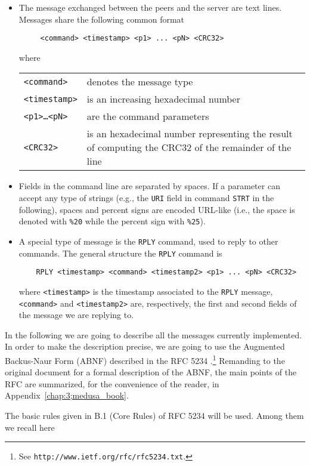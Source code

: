 \documentclass{medusabook}
\begin{document}
\begin{itemize}
\item
The message exchanged between the peers and the server are text lines.
Messages share the following common format
%
\begin{verbatim}
     <command> <timestamp> <p1> ... <pN> <CRC32>
\end{verbatim}
%
where 
\begin{center}
\begin{tabular}{p{}p{}}
  \texttt{<command>}\dotfill&denotes the message type\\
  \texttt{<timestamp>}\dotfill&is an increasing hexadecimal number\\
  \texttt{<p1>\ldots<pN>}\dotfill&are the command parameters\\
  \texttt{<CRC32>}\dotfill&is an hexadecimal number representing the
  result of computing the CRC32 of the remainder of the line
\end{tabular}
\end{center}
%
\item
Fields in the command line are separated by spaces.  If a parameter
can accept any type of strings (e.g., the \texttt{URI} field in
command \texttt{STRT} in the following), spaces and percent signs are
encoded URL-like (i.e., the space is denoted with \texttt{\%20} while
the percent sign with \texttt{\%25}).
\item
A special type of message is the \texttt{RPLY} command, used to reply
to other commands.  The general structure the \texttt{RPLY} command is
%
 \begin{verbatim}
    RPLY <timestamp> <command> <timestamp2> <p1> ... <pN> <CRC32>
\end{verbatim}
%
where \texttt{<timestamp>} is the timestamp associated to the
\texttt{RPLY} message, \texttt{<command>} and \texttt{<timestamp2>}
are, respectively, the first and second fields of the
message we are replying to.
\end{itemize}
%
In the following we are going to describe all the messages currently
implemented.  In order to make the description precise, we are going
to use the Augmented Backus-Naur Form (ABNF) described in the RFC
5234 \cite{rfc5234}.\footnote{See
  \texttt{http://www.ietf.org/rfc/rfc5234.txt}.} 
Remanding to the original document for a formal description of the
ABNF, the main points of the RFC are summarized, for the convenience
of the reader, in Appendix~\ref{chap:3;medusa_book}.  

The basic rules given in B.1 (Core Rules) of RFC 5234 \cite{rfc5234}
will be used.  Among them we recall here
\end{document}
